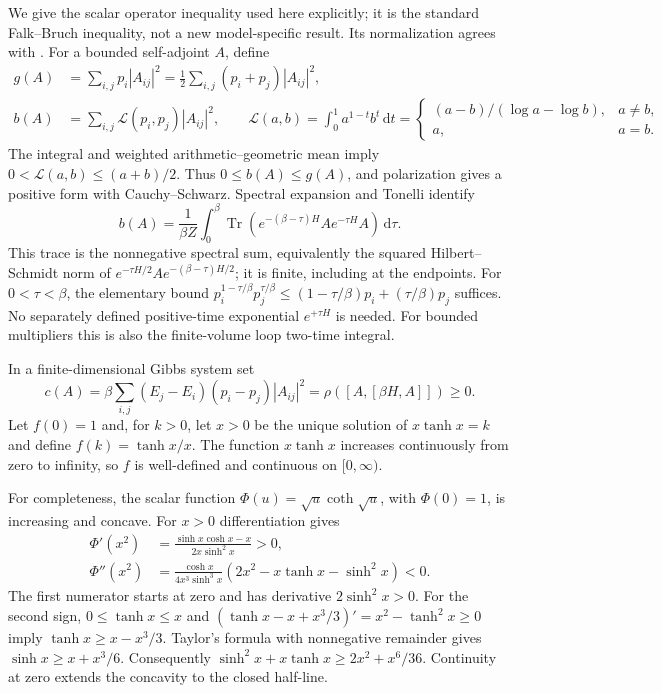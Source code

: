 \documentclass[11pt]{article}
\numberwithin{equation}{section}
\theoremstyle{definition}
\newcommand{\dd}{\,\mathrm d}
\newcommand{\Tr}{\operatorname{Tr}}
\begin{document}
We give the scalar operator inequality used here explicitly; it is the
standard Falk--Bruch inequality, not a new model-specific result.  Its
normalization agrees with \cite[Proposition 3.18, (3.65), (3.68)]{KKK}.
For a bounded self-adjoint $A$, define
\begin{align}
 g(A)&=\sum_{i,j}p_i|A_{ij}|^2
       =\frac12\sum_{i,j}(p_i+p_j)|A_{ij}|^2,\nonumber\\
 b(A)&=\sum_{i,j}\mathcal L(p_i,p_j)|A_{ij}|^2,\qquad
 \mathcal L(a,b)=\int_0^1 a^{1-t}b^t\dd t
 =\begin{cases}(a-b)/(\log a-\log b),&a\ne b,\\a,&a=b.
 \end{cases} \label{eq:collective-log-mean}
\end{align}
The integral and weighted arithmetic--geometric mean imply
$0<\mathcal L(a,b)\leq(a+b)/2$.  Thus $0\leq b(A)\leq g(A)$, and
polarization gives a positive form with Cauchy--Schwarz.  Spectral expansion
and Tonelli identify
\begin{equation}
 b(A)=\frac1{\beta Z}\int_0^\beta
 \Tr\left(e^{-(\beta-\tau)H}A e^{-\tau H}A\right)\dd\tau.
 \label{eq:collective-duhamel-spectral}
\end{equation}
This trace is the nonnegative spectral sum, equivalently the squared
Hilbert--Schmidt norm of
$e^{-\tau H/2}A e^{-(\beta-\tau)H/2}$; it is finite, including at
the endpoints.  For $0<\tau<\beta$, the elementary bound
$p_i^{1-\tau/\beta}p_j^{\tau/\beta}\leq
(1-\tau/\beta)p_i+(\tau/\beta)p_j$ suffices.  No separately defined
positive-time exponential $e^{+\tau H}$ is needed.  For bounded
multipliers this is also the finite-volume loop two-time integral.

In a finite-dimensional Gibbs system set
\begin{equation}
 c(A)=\beta\sum_{i,j}(E_j-E_i)(p_i-p_j)|A_{ij}|^2
      =\rho([A,[\beta H,A]])\geq0.
 \label{eq:finite-spectral-c}
\end{equation}
Let $f(0)=1$ and, for $k>0$, let $x>0$ be the unique solution of
$x\tanh x=k$ and define $f(k)=\tanh x/x$.  The function $x\tanh x$
increases continuously from zero to infinity, so $f$ is well-defined and
continuous on $[0,\infty)$.

For completeness, the scalar function
$\Phi(u)=\sqrt u\coth\sqrt u$, with $\Phi(0)=1$, is increasing and
concave.  For $x>0$ differentiation gives
\begin{align}
 \Phi'(x^2)&=\frac{\sinh x\cosh x-x}{2x\sinh^2x}>0,\nonumber\\
 \Phi''(x^2)&=\frac{\cosh x}{4x^3\sinh^3x}
       \left(2x^2-x\tanh x-\sinh^2x\right)<0.
 \label{eq:falk-phi-concavity}
\end{align}
The first numerator starts at zero and has derivative $2\sinh^2x>0$.
For the second sign, $0\leq\tanh x\leq x$ and
$(\tanh x-x+x^3/3)'=x^2-\tanh^2x\geq0$ imply
$\tanh x\geq x-x^3/3$.  Taylor's formula with nonnegative remainder
gives $\sinh x\geq x+x^3/6$.  Consequently
$\sinh^2x+x\tanh x\geq2x^2+x^6/36$.  Continuity at zero extends
the concavity to the closed half-line.
\end{document}

